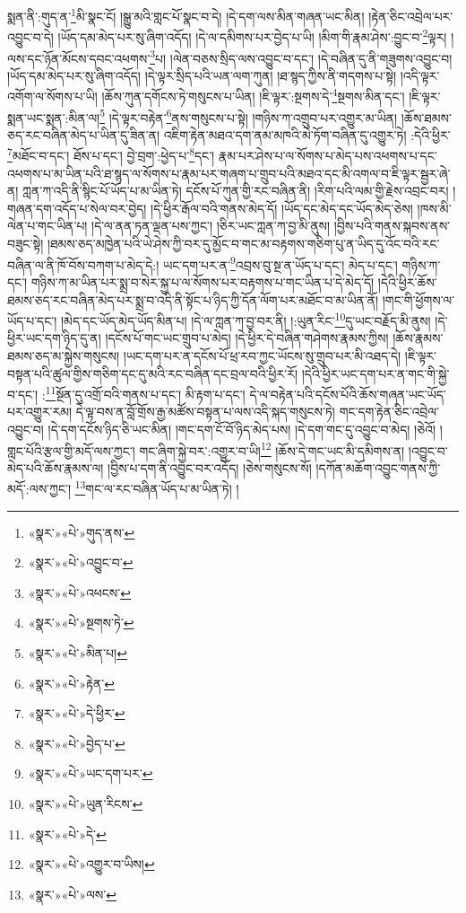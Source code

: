 སྨན་ནི་:གུད་ན་\footnote{«སྣར་»«པེ་»གུད་ནས་}མི་སྣང་ངོ། །སྒྱུ་མའི་གླང་པོ་སྣང་བ་དེ། །དེ་དག་ལས་མིན་གཞན་ཡང་མིན། །རྟེན་ཅིང་འབྲེལ་པར་འབྱུང་བ་དེ། །ཡོད་དམ་མེད་པར་སུ་ཞིག་འདོད། །དེ་ལ་དམིགས་པར་བྱེད་པ་ཡི། །མིག་གི་རྣམ་ཤེས་:བྱུང་བ་\footnote{«སྣར་»«པེ་»འབྱུང་བ་}ལྟར། །ལས་དང་ཉོན་མོངས་དབང་འཕགས་\footnote{«སྣར་»«པེ་»འཕངས་}པ། །ལེན་བཅས་སྲིད་ལས་འབྱུང་བ་དང་། །དེ་བཞིན་དུ་ནི་གཟུགས་འབྱུང་བ། །ཡོད་དམ་མེད་པར་སུ་ཞིག་འདོད། །དེ་ལྟར་སྲིད་པའི་ཡན་ལག་ཀུན། །ཐ་སྙད་ཀྱིས་ནི་གདགས་པ་སྟེ། །འདི་ལྟར་འགོག་ལ་སོགས་པ་ཡི། །ཆོས་ཀུན་དགོངས་ཏེ་གསུངས་པ་ཡིན། །ཇི་ལྟར་:སྔགས་དེ་\footnote{«སྣར་»«པེ་»སྔགས་ཏེ་}སྔགས་མིན་དང་། །ཇི་ལྟར་སྨན་ཡང་སྨན་:མིན་ལ།\footnote{«སྣར་»«པེ་»མིན་པ།} །དེ་ལྟར་བརྟེན་\footnote{«སྣར་»«པེ་»རྟེན་}ནས་གསུངས་པ་སྟེ། །གཉིས་ཀ་འགྲུབ་པར་འགྱུར་མ་ཡིན། །ཆོས་ཐམས་ཅད་རང་བཞིན་མེད་པ་ཡིན་དུ་ཟིན་ན། འཇིག་རྟེན་མཐའ་དག་ནམ་མཁའི་མེ་ཏོག་བཞིན་དུ་འགྱུར་ཏེ། :དེའི་ཕྱིར་\footnote{«སྣར་»«པེ་»དེ་ཕྱིར་}མཐོང་བ་དང་། ཐོས་པ་དང་། བྱེ་བྲག་:ཕྱེད་པ་\footnote{«སྣར་»«པེ་»བྱེད་པ་}དང་། རྣམ་པར་ཤེས་པ་ལ་སོགས་པ་མེད་པས་འཕགས་པ་དང་འཕགས་པ་མ་ཡིན་པའི་ཐ་སྙད་ལ་སོགས་པ་རྣམ་པར་གཞག་པ་གྲུབ་པའི་མཐའ་དང་མི་འགལ་བ་ཇི་ལྟར་སྦྱར་ཞེ་ན། ཀླན་ཀ་འདི་ནི་སྙིང་པོ་ཡོད་པ་མ་ཡིན་ཏེ། དངོས་པོ་ཀུན་གྱི་རང་བཞིན་ནི། །རིག་པའི་ལམ་གྱི་རྗེས་འབྲང་བར། །གཞན་དག་འདོད་པ་སེལ་བར་བྱེད། །དེ་ཕྱིར་རྒོལ་བའི་གནས་མེད་དོ། །ཡོད་དང་མེད་དང་ཡོད་མེད་ཅེས། །ཁས་མི་ལེན་པ་གང་ཡིན་པ། །དེ་ལ་ནན་ཏན་ལྡན་པས་ཀྱང་། །ཅིར་ཡང་ཀླན་ཀ་བྱ་མི་ནུས། །བྱིས་པའི་གནས་སྐབས་ནས་བཟུང་སྟེ། །ཐམས་ཅད་མཁྱེན་པའི་ཡེ་ཤེས་ཀྱི་བར་དུ་མྱོང་བ་གང་མ་བརྟགས་གཅིག་པུ་ན་ཡིད་དུ་འོང་བའི་རང་བཞིན་ལ་ནི་ཁོ་བོས་བཀག་པ་མེད་དེ:། ཡང་དག་པར་ན་\footnote{«སྣར་»«པེ་»ཡང་དག་པར་}འབྲས་བུ་སྔ་ན་ཡོད་པ་དང་། མེད་པ་དང་། གཉིས་ཀ་དང་། གཉིས་ཀ་མ་ཡིན་པར་སྨྲ་བ་སེར་སྐྱ་པ་ལ་སོགས་པར་བརྟགས་པ་གང་ཡིན་པ་དེ་མེད་དོ། །དེའི་ཕྱིར་ཆོས་ཐམས་ཅད་རང་བཞིན་མེད་པར་སྨྲ་བ་འདི་ནི་སྟོང་པ་ཉིད་ཀྱི་དོན་ལོག་པར་མཐོང་བ་མ་ཡིན་ནོ། །གང་གི་ཕྱོགས་ལ་ཡོད་པ་དང་། །མེད་དང་ཡོད་མེད་ཡོད་མིན་པ། །དེ་ལ་ཀླན་ཀ་བྱ་བར་ནི། །:ཡུན་རིང་\footnote{«སྣར་»«པེ་»ཡུན་རིངས་}དུ་ཡང་བརྗོད་མི་ནུས། །དེ་ཕྱིར་ཡང་དག་ཉིད་དུ་ན། །དངོས་པོ་གང་ཡང་གྲུབ་པ་མེད། །དེ་ཕྱིར་དེ་བཞིན་གཤེགས་རྣམས་ཀྱིས། །ཆོས་རྣམས་ཐམས་ཅད་མ་སྐྱེས་གསུངས། །ཡང་དག་པར་ན་དངོས་པོ་ཕྲ་རབ་ཀྱང་ཡོངས་སུ་གྲུབ་པར་མི་འཐད་དེ། །ཇི་ལྟར་བསྟན་པའི་ཚུལ་གྱིས་གཅིག་དང་དུ་མའི་རང་བཞིན་དང་བྲལ་བའི་ཕྱིར་རོ། །དེའི་ཕྱིར་ཡང་དག་པར་ན་གང་གི་སྐྱེ་བ་དང་། :\footnote{«སྣར་»«པེ་»དེ་}སྔོན་དུ་འགྲོ་བའི་གནས་པ་དང་། མི་རྟག་པ་དང་། དེ་ལ་བརྟེན་པའི་དངོས་པོའི་ཆོས་གཞན་ཡང་ཡོད་པར་འགྱུར་རམ། དེ་ལྟ་བས་ན་བློ་གྲོས་རྒྱ་མཚོས་བསྟན་པ་ལས་འདི་སྐད་གསུངས་ཏེ། གང་དག་རྟེན་ཅིང་འབྲེལ་འབྱུང་བ། །དེ་དག་དངོས་ཉིད་ཅི་ཡང་མིན། །གང་དག་ངོ་བོ་ཉིད་མེད་པས། །དེ་དག་གང་དུ་འབྱུང་བ་མེད། །ཅེའོ། །གླང་པོའི་རྩལ་གྱི་མདོ་ལས་ཀྱང་། གང་ཞིག་སྐྱེ་བར་:འགྱུར་བ་ཡི།\footnote{«སྣར་»«པེ་»འགྱུར་བ་ཡིས།} །ཆོས་དེ་གང་ཡང་མི་དམིགས་ན། །འབྱུང་བ་མེད་པའི་ཆོས་རྣམས་ལ། །བྱིས་པ་དག་ནི་འབྱུང་བར་འདོད། །ཅེས་གསུངས་སོ། །དཀོན་མཆོག་འབྱུང་གནས་ཀྱི་མདོ་:ལས་ཀྱང་། \footnote{«སྣར་»«པེ་»ལས་}གང་ལ་རང་བཞིན་ཡོད་པ་མ་ཡིན་ཏེ། །
